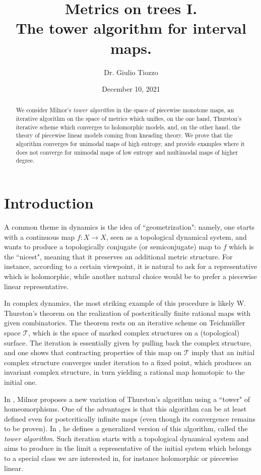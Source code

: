 \documentclass[11pt]{amsart}
\title{Metrics on trees I. \\ The tower algorithm for interval maps.}
\author{Dr. Giulio Tiozzo}
\date{December 10, 2021}
\begin{document}
\maketitle

\begin{abstract}
We consider Milnor's \emph{tower algorithm} in the space of piecewise monotone maps, 
an iterative algorithm on the space of metrics which unifies, on the one hand, Thurston's iterative 
scheme which converges to holomorphic models, and, on the other hand, the theory of 
piecewise linear models coming from kneading theory. 
We prove that the algorithm converges for unimodal maps of high entropy, 
and provide examples where it does not converge for unimodal maps of low entropy and multimodal maps 
of higher degree. 
\end{abstract}

\section{Introduction}

A common theme in dynamics is the idea of ``geometrization": namely, one starts with a continuous map 
$f: X \to X$, seen as a topological dynamical system, and wants to produce a topologically conjugate (or semiconjugate) map to $f$ which is the ``nicest", meaning that it preserves an additional metric structure. 
For instance, according to a certain viewpoint, it is natural to ask for a representative which is holomorphic, while 
another natural choice would be to prefer a piecewise linear representative. 

In complex dynamics, the most striking example of this procedure is likely W. Thurston's theorem \cite{DH} on the realization of postcritically finite rational maps with given combinatorics. The theorem rests on an iterative scheme on Teichm\"uller space $\mathcal{T}$, which
is the space of marked complex structures on a (topological) surface.  The iteration is essentially given by pulling back the complex structure, and one shows that contracting properties of this map on $\mathcal{T}$ imply that an initial complex structure converges under iteration to a fixed point, which produces an invariant complex structure, in turn yielding a rational map homotopic to the initial one.  

In \cite{Mil}, Milnor proposes a new variation of Thurston's algorithm 
using a ``tower" of homeomorphisms. One of the advantages is that this algorithm can be 
at least defined even for postcritically infinite maps (even though its convergence remains to be proven). 
In \cite{Mil-slides}, he defines a generalized version of this algorithm, called the \emph{tower algorithm}. 
Such iteration starts with a topological dynamical system and aims to produce in the limit a
representative of the initial system which belongs to a special class we are interested in,
for instance holomorphic or piecewise linear.
\end{document}
